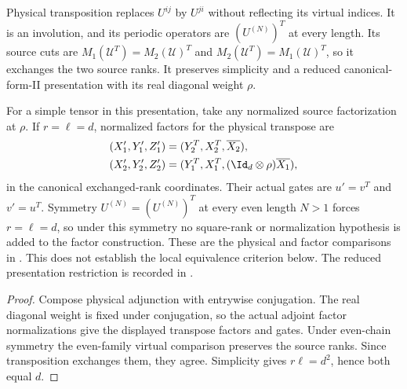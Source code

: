 \begin{lemma}
    \label{lem:mpu_physical_transpose_source_factors}
    \leanok
    Physical transposition replaces $U^{ij}$ by $U^{ji}$ without reflecting
    its virtual indices. It is an involution, and its periodic operators are
    $(U^{(N)})^T$ at every length. Its source cuts are
    $M_1(\mathcal U^T)=M_2(\mathcal U)^T$ and
    $M_2(\mathcal U^T)=M_1(\mathcal U)^T$, so it exchanges the two source
    ranks. It preserves simplicity and a reduced canonical-form-II
    presentation with its real diagonal weight $\rho$.

    For a simple tensor in this presentation, take any normalized source
    factorization at $\rho$. If $r=\ell=d$, normalized factors for the
    physical transpose are
    \begin{align}
        (X_1',Y_1',Z_1') & =(Y_2^T,X_2^T,\overline{X_2}), \\
        (X_2',Y_2',Z_2') & =(Y_1^T,X_1^T,
        (\Id_d\otimes\rho)\overline{X_1}),
    \end{align}
    in the canonical exchanged-rank coordinates. Their actual gates are
    $u'=v^T$ and $v'=u^T$. Symmetry
    $U^{(N)}=(U^{(N)})^T$ at every even length $N>1$ forces $r=\ell=d$,
    so under this symmetry no square-rank or normalization hypothesis is added
    to the factor construction. These are the physical and factor
    comparisons in \cite[lines~1258--1288]{Cirac2017MPU}.
    This does not establish the local equivalence criterion below. The reduced
    presentation restriction is recorded in
    \cite{gap:mpu_canonical_form_full_support}.
\end{lemma}

\begin{proof}\leanok
    Compose physical adjunction with entrywise conjugation. The real diagonal
    weight is fixed under conjugation, so the actual adjoint factor
    normalizations give the displayed transpose factors and gates. Under
    even-chain symmetry the even-family virtual comparison preserves the
    source ranks. Since transposition exchanges them, they agree. Simplicity
    gives $r\ell=d^2$, hence both equal $d$.
\end{proof}

